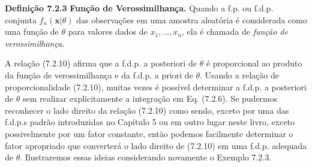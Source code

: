 \vspace{1cm}
\noindent\textbf{Definição 7.2.3} \quad \textbf{Função de Verossimilhança.} Quando a f.p. ou f.d.p. conjunta $f_n(\mathbf{x}|\theta)$ das observações em uma amostra aleatória é considerada como uma função de $\theta$ para valores dados de $x_1, \dots, x_n$, ela é chamada de \textit{função de verossimilhança}.

\vspace{1cm}
A relação (7.2.10) afirma que a f.d.p. a posteriori de $\theta$ é proporcional ao produto da função de verossimilhança e da f.d.p. a priori de $\theta$.
Usando a relação de proporcionalidade (7.2.10), muitas vezes é possível determinar a f.d.p. a posteriori de $\theta$ sem realizar explicitamente a integração em Eq. (7.2.6). Se pudermos reconhecer o lado direito da relação (7.2.10) como sendo, exceto por uma das f.d.p.s padrão introduzidas no Capítulo 5 ou em outro lugar neste livro, exceto possivelmente por um fator constante, então podemos facilmente determinar o fator apropriado que converterá o lado direito de (7.2.10) em uma f.d.p. adequada de $\theta$. Ilustraremos essas ideias considerando novamente o Exemplo 7.2.3.

